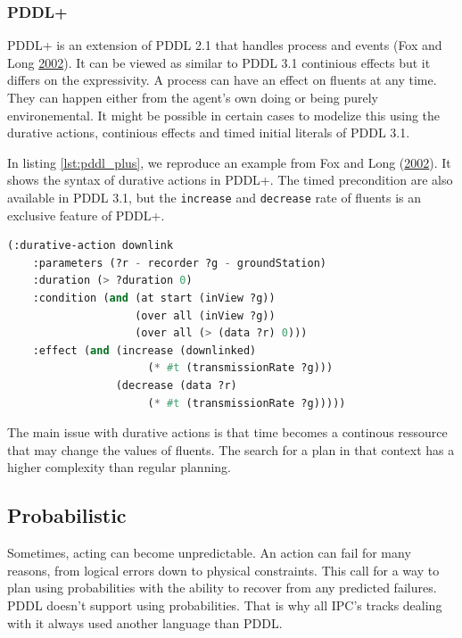 \documentclass[11pt,a4paper,twoside,openright,titlepage,numbers=noenddot,headinclude,cleardoublepage=empty,openany]{scrreprt}
\theoremstyle{plain}
\theoremstyle{definition}
\theoremstyle{remark}
\newcommand{\passthrough}[1]{#1}
\begin{document}
\hypertarget{pddl}{%
\subsubsection{PDDL+}\label{pddl}}

PDDL+ is an extension of PDDL 2.1 that handles process and events (Fox
and Long \protect\hyperlink{ref-fox_pddl_2002}{2002}). It can be viewed
as similar to PDDL 3.1 continious effects but it differs on the
expressivity. A process can have an effect on fluents at any time. They
can happen either from the agent's own doing or being purely
environemental. It might be possible in certain cases to modelize this
using the durative actions, continious effects and timed initial
literals of PDDL 3.1.

In listing \ref{lst:pddl_plus}, we reproduce an example from Fox and
Long (\protect\hyperlink{ref-fox_pddl_2002}{2002}). It shows the syntax
of durative actions in PDDL+. The timed precondition are also available
in PDDL 3.1, but the \passthrough{\lstinline!increase!} and
\passthrough{\lstinline!decrease!} rate of fluents is an exclusive
feature of PDDL+.

\begin{lstlisting}[language=Lisp, caption={Example of PDDL+ durative action from Fox's paper.}, escapechar={$}, label=lst:pddl_plus]
(:durative-action downlink
    :parameters (?r - recorder ?g - groundStation)
    :duration (> ?duration 0)
    :condition (and (at start (inView ?g))
                    (over all (inView ?g))
                    (over all (> (data ?r) 0)))
    :effect (and (increase (downlinked)
                      (* #t (transmissionRate ?g)))
                 (decrease (data ?r)
                      (* #t (transmissionRate ?g)))))
\end{lstlisting}

The main issue with durative actions is that time becomes a continous
ressource that may change the values of fluents. The search for a plan
in that context has a higher complexity than regular planning.

\hypertarget{probabilistic}{%
\subsection{Probabilistic}\label{probabilistic}}

Sometimes, acting can become unpredictable. An action can fail for many
reasons, from logical errors down to physical constraints. This call for
a way to plan using probabilities with the ability to recover from any
predicted failures. PDDL doesn't support using probabilities. That is
why all IPC's tracks dealing with it always used another language than
PDDL.
\end{document}
